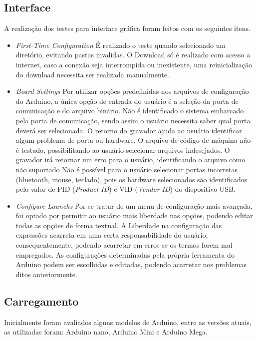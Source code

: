 \subsection{Interface}
A realização dos testes para interface gráfica foram feitos com os seguintes itens.
\begin{itemize}
\item \textit{First-Time Configuration}
\subitem É realizado o teste quando selecionado um diretório, evitando pastas invalidas.
\subitem O Download só é realizado com acesso a internet, caso a conexão seja interrompida ou inexistente, uma reinicialização do download necessita ser realizada manualmente.

\item  \textit{Board Settings}
\subitem Por utilizar opções predefinidas nos arquivos de configuração do Arduino, a única opção de entrada do usuário é a seleção da porta de comunicação e do arquivo binário. 
\subitem Não é identificado o sistema embarcado pela porta de comunicação, sendo assim o usuário necessita saber qual porta deverá ser selecionada. O retorno do gravador ajuda ao usuário identificar algum problema de porta ou hardware.
\subitem O arquivo de código de máquina não é testado, possibilitando ao usuário selecionar arquivos indesejados. O gravador irá retornar um erro para o usuário, identificando o arquivo como não suportado
\subitem Não é possível para o usuário selecionar portas incorretas (bluetooth, mouse, teclado), pois os hardware selecionados são identificados pelo valor de PID (\textit{Product ID}) e VID (\textit{Vendor ID}) do dispositivo USB.

\item  \textit{Configure Launchs}
\subitem Por se tratar de um menu de configuração mais avançada, foi optado por permitir ao usuário mais liberdade nas opções, podendo editar todas as opções de forma textual. A Liberdade na configuração das expressões acarreta em uma certa responsabilidade do usuário, consequentemente, podendo acarretar em erros se os termos forem mal empregados.
\subitem As configurações determinadas pela própria ferramenta do Arduino podem ser escolhidas e editadas, podendo acarretar nos problemas ditos anteriormente.

\end{itemize}

\subsection{Carregamento}
Inicialmente foram avaliados alguns modelos de Arduíno, entre as versões atuais, as utilizadas foram: Arduino nano, Arduino Mini e Arduino Mega.

